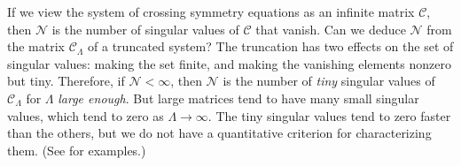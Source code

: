 \documentclass[12pt, a4paper]{article}
\theoremstyle{break}
\begin{document}
If we view the system of crossing symmetry equations as an infinite matrix $\mathcal{C}$, then $\mathcal{N}$ is the number of singular values of $\mathcal{C}$ that vanish. Can we deduce $\mathcal{N}$ from the matrix $\mathcal{C}_\Lambda$ of a truncated system? The truncation has two effects on the set of singular values: making the set finite, and making the vanishing elements nonzero but tiny. Therefore, if $\mathcal{N}<\infty$, then $\mathcal{N}$ is the number of \textit{tiny} singular values of $\mathcal{C}_\Lambda$ for $\Lambda$ \textit{large enough}. But large matrices tend to have many small singular values, which tend to zero as $\Lambda\to \infty$. The tiny singular values tend to zero faster than the others, but we do not have a quantitative criterion for characterizing them. (See \cite{gjnrs23} for examples.) 
\end{document}

